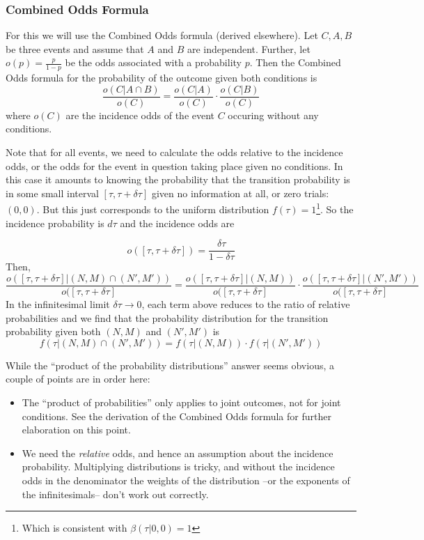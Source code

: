 \documentclass[12pt]{report}
\newcommand{\bdm}{\begin{displaymath}} %
\newcommand{\edm}{\end{displaymath}} %
\newcommand{\bi}{\begin{itemize}} %
\newcommand{\ei}{\end{itemize}} %
\begin{document}
\subsubsection{Combined Odds Formula}
For this we will use the Combined Odds formula (derived
elsewhere). Let \(C,A,B\) be three events and assume that \(A\) and
\(B\) are independent. Further, let \(o(p) = \frac{p}{1-p}\) be the
odds associated with a probability \(p\). Then the Combined Odds
formula for the probability of the outcome given both conditions is
\bdm
\frac{o(C|A\cap B)}{o(C)}=\frac{o(C|A)}{o(C)}\cdot \frac{o(C|B)}{o(C)}
\edm
where \(o(C)\) are the incidence odds of the event \(C\) occuring
without any conditions.

Note that for all events, we need to calculate the odds relative to
the incidence odds, or the odds for the event in question taking place
given no conditions. In this case it amounts to knowing the
probability that the transition probability is in some small interval
\([\tau, \tau+\delta\tau]\) given no information at all, or zero
trials: \((0,0)\). But this just corresponds to the uniform
distribution \(f(\tau) =1\)\footnote{Which is consistent with
  \(\beta(\tau|0,0)=1\)}. So the incidence probability is \(d\tau\)
and the incidence odds are

\bdm
o([\tau, \tau+\delta\tau]) = \frac{\delta\tau}{1-\delta\tau}
\edm
Then,
\bdm
\frac{o([\tau, \tau+\delta\tau]|(N,M)\cap (N',M'))}{o([\tau, \tau+\delta\tau]}
= \frac{o([\tau, \tau+\delta\tau]|(N,M))}{o([\tau, \tau+\delta\tau]}
\cdot \frac{o([\tau, \tau+\delta\tau]|(N',M'))}{o([\tau, \tau+\delta\tau]} 
\edm
In the infinitesimal limit \(\delta\tau \rightarrow 0\), each term
above reduces to the ratio of relative probabilities and we find that
the probability distribution for the transition probability given both
\((N,M)\) and \((N',M')\) is
\bdm
f(\tau|(N,M)\cap (N',M'))=f(\tau|(N,M))\cdot f(\tau| (N',M'))
\edm

While the ``product of the probability distributions'' answer seems
obvious, a couple of points are in order here:
\bi
\item The ``product of probabilities'' only applies to joint outcomes,
  not for joint conditions. See the derivation of the Combined Odds
  formula for further elaboration on this point.
\item We need the {\em relative} odds, and hence an assumption about
  the incidence probability. Multiplying distributions is tricky, and
  without the incidence odds in the denominator the weights of the
  distribution --or the exponents of the infinitesimals-- don't work
  out correctly.
\ei
  
\end{document}

